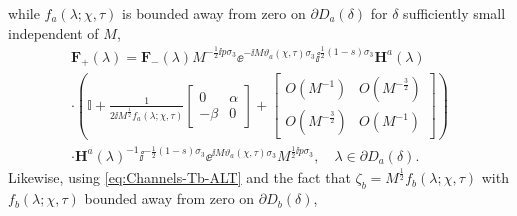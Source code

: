 while $f_a(\lambda;\chi,\tau)$ is bounded away from zero on $\partial D_a(\delta)$ for $\delta$ sufficiently small independent of 
$M$,
\begin{multline}
\mathbf{F}_+(\lambda)=\mathbf{F}_-(\lambda)
M^{-\frac{1}{2}\ii p\sigma_3}\ee^{-\ii M\vartheta_a(\chi,\tau)\sigma_3}\ii^{\frac{1}{2}(1-s)\sigma_3}\mathbf{H}^a(\lambda)\\
\cdot 
\left(\mathbb{I}+\frac{1}{2\ii M^{\frac{1}{2}}f_a(\lambda;\chi,\tau)}\begin{bmatrix}0 & \alpha\\-\beta & 0\end{bmatrix}+\begin{bmatrix}O(M^{-1}) & O(M^{-\frac{3}{2}})\\O(M^{-\frac{3}{2}}) & O(M^{-1})\end{bmatrix}\right)\\
\cdot\mathbf{H}^a(\lambda)^{-1}\ii^{-\frac{1}{2}(1-s)\sigma_3}\ee^{\ii M\vartheta_a(\chi,\tau)\sigma_3}M^{\frac{1}{2}\ii p\sigma_3},\quad\lambda\in\partial D_a(\delta).
\label{eq:Channels-VF-partialDa-ALT}
\end{multline}
Likewise, using \eqref{eq:Channels-Tb-ALT} and the fact that 
$\zeta_b=M^\frac{1}{2}f_b(\lambda;\chi,\tau)$
with $f_b(\lambda;\chi,\tau)$ bounded away from zero on $\partial D_b(\delta)$, 
